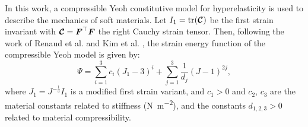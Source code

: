 In this work, a compressible Yeoh constitutive model for hyperelasticity is used to describe the mechanics of soft materials. Let $I_1 = \textrm{tr}(\boldsymbol{\mathcal{C}})$ be the first strain invariant with $\boldsymbol{\mathcal{C}} = \boldsymbol{F}^\top \boldsymbol{F}$ the right Cauchy strain tensor. Then, following the work of Renaud et al. \cite{Renaud2011} and Kim  et al. \cite{Kim2018}, the strain energy function of the compressible Yeoh model is given by:
%
\begin{equation}
{\Psi} = \sum_{i = 1}^{3} c_i (J_1 - 3)^i + \sum_{j = 1}^{3} \frac{1}{d_j} (J - 1)^{2j},
\label{eq:C3:psi_model_yeoh}
\end{equation}
%
where $J_1 = J^{-\tfrac{1}{3}} I_1$ is a modified first strain variant, and $c_1 > 0$ and $c_2$, $c_3$ are the material constants related to stiffness (\si{\newton \per \square \meter}), and the constants $d_{1,2,3} > 0$ related to material compressibility. %


